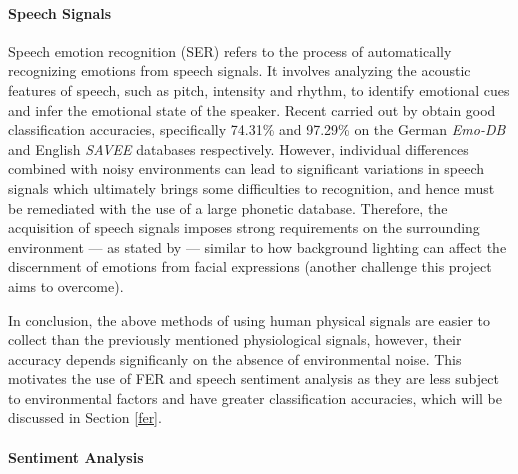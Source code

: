 \documentclass[12pt, a4paper]{article}
\newcommand{\np}
    {
    \vskip 0.4cm
    }
\begin{document}
\paragraph{Speech Signals}

Speech emotion recognition (SER) refers to the process of automatically recognizing emotions from speech signals. It involves analyzing the acoustic features of speech, such as pitch, intensity and rhythm, to identify emotional cues and infer the emotional state of the speaker. Recent carried out by \cite{ton2019speech} obtain good classification accuracies, specifically 74.31\% and 97.29\% on the German \textit{Emo-DB} and English \textit{SAVEE} databases respectively. However, individual differences combined with noisy environments can lead to significant variations in speech signals which ultimately brings some difficulties to recognition, and hence must be remediated with the use of a large phonetic database. Therefore, the acquisition of speech signals imposes strong requirements on the surrounding environment --- as stated by \cite{you2006emotion} --- similar to how background lighting can affect the discernment of emotions from facial expressions (another challenge this project aims to overcome). 
\np
In conclusion, the above methods of using human physical signals are easier to collect than the previously mentioned physiological signals, however, their accuracy depends significanly on the absence of environmental noise. This motivates the use of FER and speech sentiment analysis as they are less subject to environmental factors and have greater classification accuracies, which will be discussed in Section \ref{fer}.

\paragraph{Sentiment Analysis}
\label{bgsentanal}
\end{document}
